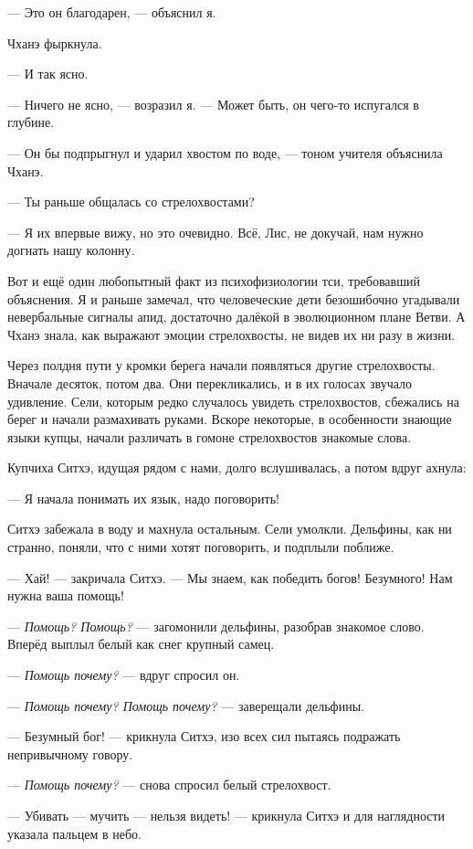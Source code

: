 --- Это он благодарен, --- объяснил я.

Чханэ фыркнула.

--- И так ясно.

--- Ничего не ясно, --- возразил я.
--- Может быть, он чего-то испугался в глубине.

--- Он бы подпрыгнул и ударил хвостом по воде, --- тоном учителя объяснила Чханэ.

--- Ты раньше общалась со стрелохвостами?

--- Я их впервые вижу, но это очевидно.
Всё, Лис, не докучай, нам нужно догнать нашу колонну.

Вот и ещё один любопытный факт из психофизиологии тси, требовавший объяснения.
Я и раньше замечал, что человеческие дети безошибочно угадывали невербальные сигналы апид, достаточно далёкой в эволюционном плане Ветви.
А Чханэ знала, как выражают эмоции стрелохвосты, не видев их ни разу в жизни.

Через полдня пути у кромки берега начали появляться другие стрелохвосты.
Вначале десяток, потом два. Они перекликались, и в их голосах звучало удивление.
Сели, которым редко случалось увидеть стрелохвостов, сбежались на берег и начали размахивать руками.
Вскоре некоторые, в особенности знающие языки купцы, начали различать в гомоне стрелохвостов знакомые слова.

Купчиха Ситхэ, идущая рядом с нами, долго вслушивалась, а потом вдруг ахнула:

--- Я начала понимать их язык, надо поговорить!

Ситхэ забежала в воду и махнула остальным.
Сели умолкли.
Дельфины, как ни странно, поняли, что с ними хотят поговорить, и подплыли поближе.

--- Хай! --- закричала Ситхэ.
--- Мы знаем, как победить богов!
Безумного!
Нам нужна ваша помощь!

--- \emph{Помощь? Помощь?} --- загомонили дельфины, разобрав знакомое слово.
Вперёд выплыл белый как снег крупный самец.

--- \emph{Помощь почему?} --- вдруг спросил он.

--- \emph{Помощь почему? Помощь почему?} --- заверещали дельфины.

--- Безумный бог! --- крикнула Ситхэ, изо всех сил пытаясь подражать непривычному говору.

--- \emph{Помощь почему?} --- снова спросил белый стрелохвост.

--- Убивать --- мучить --- нельзя видеть! --- крикнула Ситхэ и для наглядности указала пальцем в небо.

